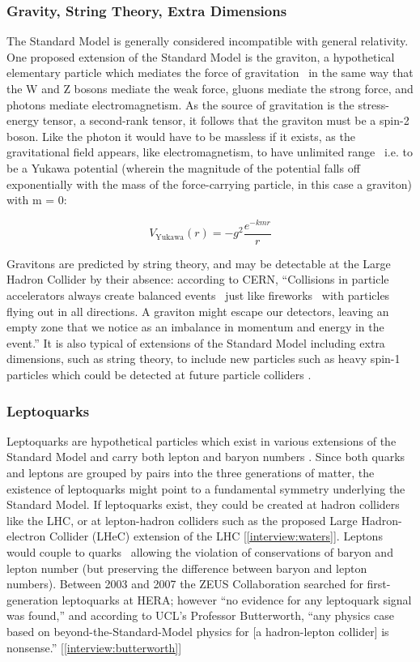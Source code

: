 \subsubsection{Gravity, String Theory, Extra Dimensions}
The Standard Model is generally considered incompatible with general relativity. One proposed extension of the Standard Model is the graviton, a hypothetical elementary particle which mediates the force of gravitation \textemdash \, in the same way that the W and Z bosons mediate the weak force, gluons mediate the strong force, and photons mediate electromagnetism. As the source of gravitation is the stress-energy tensor, a second-rank tensor, it follows that the graviton must be a spin-2 boson. Like the photon it would have to be massless if it exists, as the gravitational field appears, like electromagnetism, to have unlimited range \textemdash \, i.e. to be a Yukawa potential (wherein the magnitude of the potential falls off exponentially with the mass of the force-carrying particle, in this case a graviton) with m = 0:

\begin{equation*}
V_\text{Yukawa}(r)= -g^2\frac{e^{-kmr}}{r}
\end{equation*}

Gravitons are predicted by string theory, and may be detectable at the Large Hadron Collider by their absence: according to CERN, ``Collisions in particle accelerators always create balanced events \textemdash \, just like fireworks \textemdash \, with particles flying out in all directions. A graviton might escape our detectors, leaving an empty zone that we notice as an imbalance in momentum and energy in the event.'' \cite{CERN:Gravitons:Online,deAquino:Gravitons} It is also typical of extensions of the Standard Model including extra dimensions, such as string theory, to include new particles such as heavy spin-1 particles which could be detected at future particle colliders \cite{CLIC:Concept}.

\subsubsection{Leptoquarks}
Leptoquarks are hypothetical particles which exist in various extensions of the Standard Model and carry both lepton and baryon numbers \cite{PDG:Leptoquark}. Since both quarks and leptons are grouped by pairs into the three generations of matter, the existence of leptoquarks might point to a fundamental symmetry underlying the Standard Model. If leptoquarks exist, they could be created at hadron colliders like the LHC, or at lepton-hadron colliders such as the proposed Large Hadron-electron Collider (LHeC) extension of the LHC [\ref{interview:waters}]. Leptons would couple to quarks \textemdash \, allowing the violation of conservations of baryon and lepton number (but preserving the difference between baryon and lepton numbers). Between 2003 and 2007 the ZEUS Collaboration searched for first-generation leptoquarks at HERA; however ``no evidence for any leptoquark signal was found,'' \cite{ZEUS:Leptoquark} and according to UCL's Professor Butterworth, ``any physics case based on beyond-the-Standard-Model physics for [a hadron-lepton collider] is nonsense.'' [\ref{interview:butterworth}]
